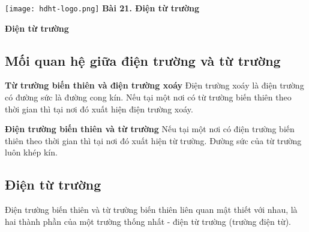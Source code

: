 \newcommand{\chapter}[2][]{
	\newcommand{\chapname}{#2}
	\begin{flushleft}
		\begin{minipage}[t]{\linewidth}
			\texttt{[image: hdht-logo.png]}
			\hspace{0pt}	
			\sffamily\bfseries\large Bài  21. Điện từ trường
			\begin{flushleft}
				\huge\bfseries #1
			\end{flushleft}
		\end{minipage}
	\end{flushleft}
	\vspace{1cm}
	\normalfont\normalsize
}
\chapter[Điện từ trường]{Điện từ trường}

\subsection{Mối quan hệ giữa điện trường và từ trường}
\textbf{Từ trường biến thiên và điện trường xoáy}
 Điện trường xoáy là điện trường có đường sức là đường cong kín.
 Nếu tại một nơi có từ trường biến thiên theo thời gian thì tại nơi đó xuất hiện điện trường xoáy.

\textbf{Điện trường biến thiên và từ trường}
 Nếu tại một nơi có điện trường biến thiên theo thời gian thì tại nơi đó xuất hiện từ trường.
Đường sức của từ trường luôn khép kín.
\subsection {Điện từ trường }
Điện trường biến thiên và từ trường biến thiên liên quan mật thiết với nhau, là hai thành phần của một trường thống nhất - điện từ trường (trường điện từ).